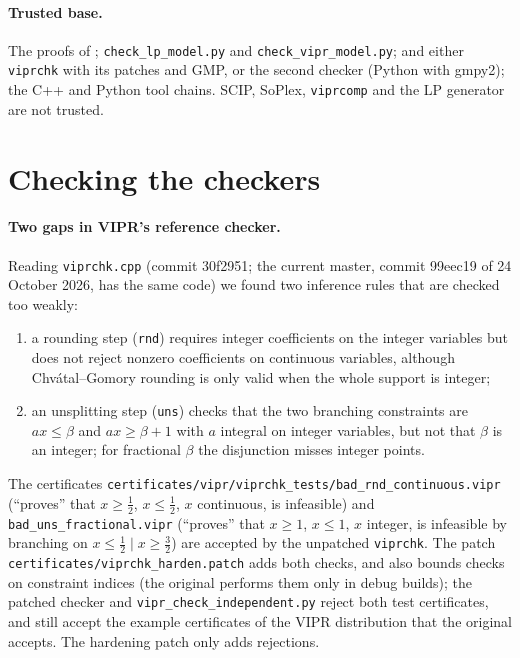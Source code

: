 \documentclass[11pt,a4paper]{report}
\begin{document}
\paragraph{Trusted base.} The proofs of ; \texttt{check\_lp\_model.py} and
\texttt{check\_vipr\_model.py}; and either \texttt{viprchk} with its patches and GMP, or the second checker
(Python with gmpy2); the C++ and Python tool chains. SCIP, SoPlex, \texttt{viprcomp} and
the LP generator are not trusted.

\section{Checking the checkers}\label{sec:checkers}

\paragraph{Two gaps in VIPR's reference checker.} Reading \texttt{viprchk.cpp} (commit 30f2951; the current master,
commit 99eec19 of 24 October 2026, has the same code) we found two inference rules that are checked too weakly:
\begin{enumerate}
\item a rounding step (\texttt{rnd}) requires integer coefficients on the integer variables but does not reject
nonzero coefficients on continuous variables, although Chv\'atal--Gomory rounding is only valid when the whole
support is integer;
\item an unsplitting step (\texttt{uns}) checks that the two branching constraints are $ax\le\beta$ and
$ax\ge\beta+1$ with $a$ integral on integer variables, but not that $\beta$ is an integer; for fractional $\beta$
the disjunction misses integer points.
\end{enumerate}
The certificates \texttt{certificates/vipr/viprchk\_tests/bad\_rnd\_continuous.vipr} (``proves'' that
$x\ge\frac12$, $x\le\frac12$, $x$ continuous, is infeasible) and \texttt{bad\_uns\_fractional.vipr} (``proves'' that
$x\ge1$, $x\le1$, $x$ integer, is infeasible by branching on $x\le\frac12\mid x\ge\frac32$) are accepted by the
unpatched \texttt{viprchk}. The patch \texttt{certificates/viprchk\_harden.patch} adds both checks, and also bounds
checks on constraint indices (the original performs them only in debug builds); the patched checker and
\texttt{vipr\_check\_independent.py} reject both test certificates, and still accept the example certificates of the VIPR distribution that the original accepts. The
hardening patch only adds rejections.
\end{document}
